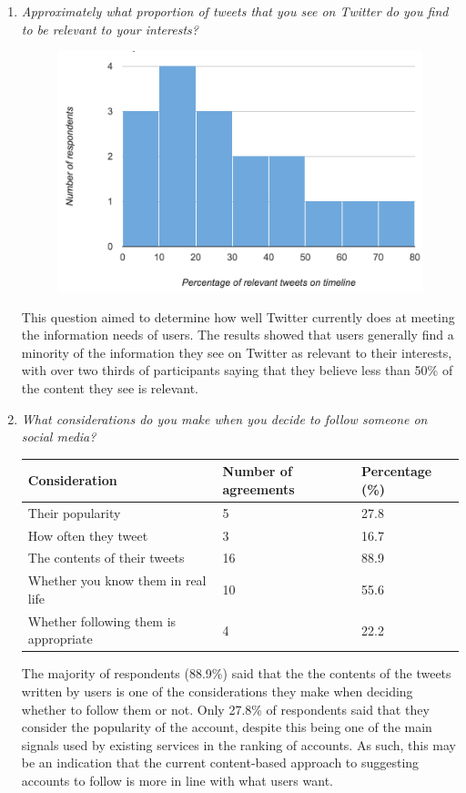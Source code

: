\documentclass{l4proj}
\begin{document}
\begin{enumerate}
\item \textit{Approximately what proportion of tweets that you see on Twitter do you find to be relevant to your interests?}
\par
\begin{figure}[H]
\centering
\includegraphics[scale=0.5]{proprelevance.png}
\label{proprelevance}
\end{figure}
This question aimed to determine how well Twitter currently does at meeting the information needs of users. The results showed that users generally find a minority of the information they see on Twitter as relevant to their interests, with over two thirds of participants saying that they believe less than 50\% of the content they see is relevant.

\item \textit{What considerations do you make when you decide to follow someone on social media?}
\begin{table}[H]
    \centering
    \begin{tabular}{| l | l | l |}
    \hline
    Consideration & Number of agreements & Percentage (\%) \\ \hline
    Their popularity & 5 & 27.8  \\ \hline
    How often they tweet & 3 & 16.7 \\ \hline
    The contents of their tweets & 16 & 88.9 \\ \hline
    Whether you know them in real life & 10 & 55.6 \\ \hline
    Whether following them is appropriate & 4 & 22.2 \\
    \hline
    \end{tabular}
\end{table}
The majority of respondents (88.9\%) said that the the contents of the tweets written by users is one of the considerations they make when deciding whether to follow them or not. Only 27.8\% of respondents said that they consider the popularity of the account, despite this being one of the main signals used by existing services in the ranking of accounts. As such, this may be an indication that the current content-based approach to suggesting accounts to follow is more in line with what users want.


\end{enumerate}
\end{document}
